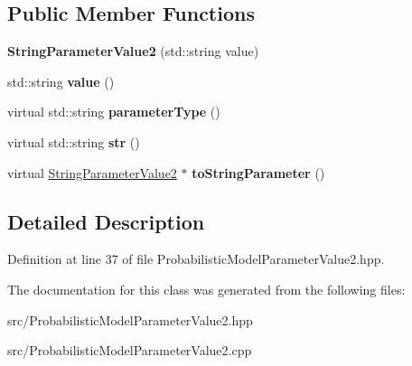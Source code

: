 \subsection*{Public Member Functions}
\begin{DoxyCompactItemize}
\item 
\mbox{\label{classtops_1_1StringParameterValue2_add7e1b379162a8b20e3bad30594a1cfc}} 
{\bfseries String\+Parameter\+Value2} (std\+::string value)
\item 
\mbox{\label{classtops_1_1StringParameterValue2_ad9d417eb14293dfc24928f84c8d25f90}} 
std\+::string {\bfseries value} ()
\item 
\mbox{\label{classtops_1_1StringParameterValue2_ab5a998107a6522f814f9beb13d46d0b0}} 
virtual std\+::string {\bfseries parameter\+Type} ()
\item 
\mbox{\label{classtops_1_1StringParameterValue2_aa2852764fcefa02d6624a9c00b5b2152}} 
virtual std\+::string {\bfseries str} ()
\item 
\mbox{\label{classtops_1_1StringParameterValue2_a6f6f21cfe67758fdabd1a04b38abc19d}} 
virtual \hyperlink{classtops_1_1StringParameterValue2}{String\+Parameter\+Value2} $\ast$ {\bfseries to\+String\+Parameter} ()
\end{DoxyCompactItemize}


\subsection{Detailed Description}


Definition at line 37 of file Probabilistic\+Model\+Parameter\+Value2.\+hpp.



The documentation for this class was generated from the following files\+:\begin{DoxyCompactItemize}
\item 
src/Probabilistic\+Model\+Parameter\+Value2.\+hpp\item 
src/Probabilistic\+Model\+Parameter\+Value2.\+cpp\end{DoxyCompactItemize}
